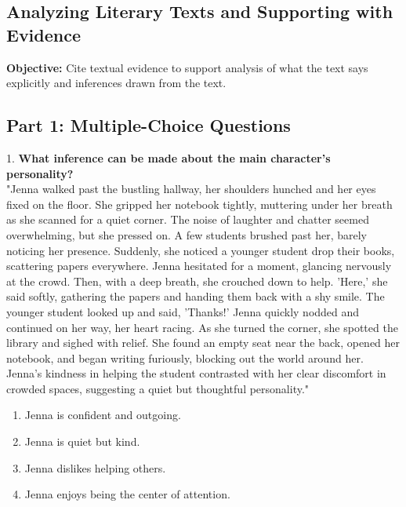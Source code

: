 \documentclass[12pt]{article}
\begin{document}
\subsection*{Analyzing Literary Texts and Supporting with Evidence}
\onehalfspacing

\begin{tcolorbox}[colframe=black!40, colback=gray!0, title=Learning Objective]
\textbf{Objective:} Cite textual evidence to support analysis of what the text says explicitly and inferences drawn from the text.
\end{tcolorbox}

\subsection*{Part 1: Multiple-Choice Questions}

1. \textbf{What inference can be made about the main character's personality?}\\
"Jenna walked past the bustling hallway, her shoulders hunched and her eyes fixed on the floor. She gripped her notebook tightly, muttering under her breath as she scanned for a quiet corner. The noise of laughter and chatter seemed overwhelming, but she pressed on. A few students brushed past her, barely noticing her presence. Suddenly, she noticed a younger student drop their books, scattering papers everywhere. Jenna hesitated for a moment, glancing nervously at the crowd. Then, with a deep breath, she crouched down to help. 'Here,' she said softly, gathering the papers and handing them back with a shy smile. The younger student looked up and said, 'Thanks!' Jenna quickly nodded and continued on her way, her heart racing. As she turned the corner, she spotted the library and sighed with relief. She found an empty seat near the back, opened her notebook, and began writing furiously, blocking out the world around her. Jenna’s kindness in helping the student contrasted with her clear discomfort in crowded spaces, suggesting a quiet but thoughtful personality."  
\begin{enumerate}[label=\Alph*.]
    \item Jenna is confident and outgoing.  
    \item Jenna is quiet but kind.  
    \item Jenna dislikes helping others.  
    \item Jenna enjoys being the center of attention.  
\end{enumerate}
\end{document}
